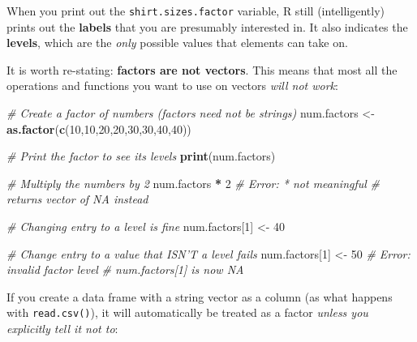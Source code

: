 \documentclass[]{book}
\newenvironment{Shaded}{\begin{snugshade}}{\end{snugshade}}
\newcommand{\KeywordTok}[1]{\textcolor[rgb]{0.13,0.29,0.53}{\textbf{#1}}}
\newcommand{\DecValTok}[1]{\textcolor[rgb]{0.00,0.00,0.81}{#1}}
\newcommand{\StringTok}[1]{\textcolor[rgb]{0.31,0.60,0.02}{#1}}
\newcommand{\CommentTok}[1]{\textcolor[rgb]{0.56,0.35,0.01}{\textit{#1}}}
\newcommand{\OperatorTok}[1]{\textcolor[rgb]{0.81,0.36,0.00}{\textbf{#1}}}
\newcommand{\NormalTok}[1]{#1}
\theoremstyle{definition}
\theoremstyle{definition}
\theoremstyle{remark}
\begin{document}
When you print out the \texttt{shirt.sizes.factor} variable, R still
(intelligently) prints out the \textbf{labels} that you are presumably
interested in. It also indicates the \textbf{levels}, which are the
\emph{only} possible values that elements can take on.

It is worth re-stating: \textbf{factors are not vectors}. This means
that most all the operations and functions you want to use on vectors
\emph{will not work}:

\begin{Shaded}
\begin{Highlighting}[]
\CommentTok{# Create a factor of numbers (factors need not be strings)}
\NormalTok{num.factors <-}\StringTok{ }\KeywordTok{as.factor}\NormalTok{(}\KeywordTok{c}\NormalTok{(}\DecValTok{10}\NormalTok{,}\DecValTok{10}\NormalTok{,}\DecValTok{20}\NormalTok{,}\DecValTok{20}\NormalTok{,}\DecValTok{30}\NormalTok{,}\DecValTok{30}\NormalTok{,}\DecValTok{40}\NormalTok{,}\DecValTok{40}\NormalTok{))}

\CommentTok{# Print the factor to see its levels}
\KeywordTok{print}\NormalTok{(num.factors)}

\CommentTok{# Multiply the numbers by 2}
\NormalTok{num.factors }\OperatorTok{*}\StringTok{ }\DecValTok{2}  \CommentTok{# Error: * not meaningful}
                 \CommentTok{# returns vector of NA instead}

\CommentTok{# Changing entry to a level is fine}
\NormalTok{num.factors[}\DecValTok{1}\NormalTok{] <-}\StringTok{ }\DecValTok{40}

\CommentTok{# Change entry to a value that ISN'T a level fails}
\NormalTok{num.factors[}\DecValTok{1}\NormalTok{] <-}\StringTok{ }\DecValTok{50}  \CommentTok{# Error: invalid factor level}
                      \CommentTok{# num.factors[1] is now NA}
\end{Highlighting}
\end{Shaded}

If you create a data frame with a string vector as a column (as what
happens with \texttt{read.csv()}), it will automatically be treated as a
factor \emph{unless you explicitly tell it not to}:
\end{document}
